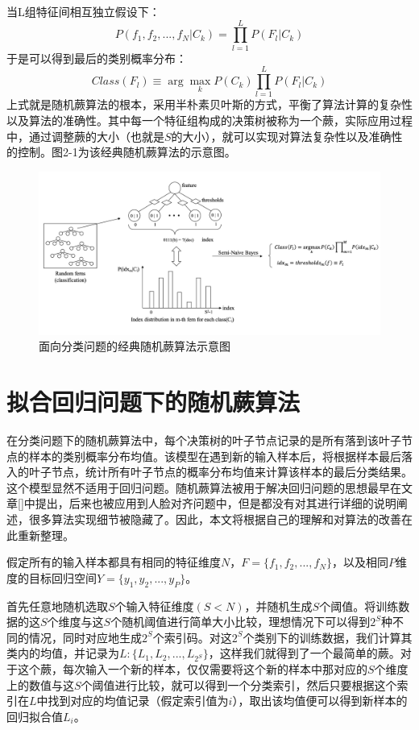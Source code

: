当L组特征间相互独立假设下：
\begin{equation}
	P(f_1,f_2,...,f_N|C_k)=\prod_{l=1}^L P(F_l|C_k)
\end{equation}
于是可以得到最后的类别概率分布：
\begin{equation}
	Class(F_l)\equiv \arg\max_k P(C_k)\prod_{l=1}^L P(F_l|C_k)
\end{equation}
上式就是随机蕨算法的根本，采用半朴素贝叶斯的方式，平衡了算法计算的复杂性以及算法的准确性。其中每一个特征组构成的决策树被称为一个蕨，实际应用过程中，通过调整蕨的大小（也就是$S$的大小），就可以实现对算法复杂性以及准确性的控制。图2-1为该经典随机蕨算法的示意图。
\begin{figure}[htb]
	\centering 
	\includegraphics[width=\textwidth]{./mypic/经典随机蕨算法的示意图.jpg} 
	\caption{面向分类问题的经典随机蕨算法示意图} 
\end{figure}



\section{拟合回归问题下的随机蕨算法}
在分类问题下的随机蕨算法中，每个决策树的叶子节点记录的是所有落到该叶子节点的样本的类别概率分布均值。该模型在遇到新的输入样本后，将根据样本最后落入的叶子节点，统计所有叶子节点的概率分布均值来计算该样本的最后分类结果。这个模型显然不适用于回归问题。随机蕨算法被用于解决回归问题的思想最早在文章[]中提出，后来也被应用到人脸对齐问题中\cite{cao2014face}，但是都没有对其进行详细的说明阐述，很多算法实现细节被隐藏了。因此，本文将根据自己的理解和对算法的改善在此重新整理。

假定所有的输入样本都具有相同的特征维度$N$，$F=\{f_1,f_2,...,f_N\}$，以及相同$P$维度的目标回归空间$Y=\{y_1,y_2,...,y_P\}$。

首先任意地随机选取$S$个输入特征维度$(S<N)$，并随机生成$S$个阈值。将训练数据的这$S$个维度与这$S$个随机阈值进行简单大小比较，理想情况下可以得到$2^S$种不同的情况，同时对应地生成$2^S$个索引码。对这$2^S$个类别下的训练数据，我们计算其类内的均值，并记录为$L:\{L_1,L_2,...,L_{2^S}\}$，这样我们就得到了一个最简单的蕨。对于这个蕨，每次输入一个新的样本，仅仅需要将这个新的样本中那对应的$S$个维度上的数值与这$S$个阈值进行比较，就可以得到一个分类索引，然后只要根据这个索引在$L$中找到对应的均值记录（假定索引值为$i$），取出该均值便可以得到新样本的回归拟合值$L_i$。

